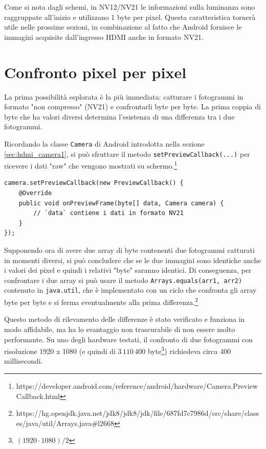 \begin{figure}[H]
\end{figure}

Come si nota dagli schemi, in NV12/NV21 le informazioni sulla luminanza sono raggruppate all'inizio e utilizzano 1 byte per pixel. Questa caratteristica tornerà utile nelle prossime sezioni, in combinazione al fatto che Android fornisce le immagini acquisite dall'ingresso HDMI anche in formato NV21.

\section{Confronto pixel per pixel}
\label{sec:diff_full}

La prima possibilità esplorata è la più immediata: catturare i fotogrammi in formato "non compresso" (NV21) e confrontarli byte per byte. La prima coppia di byte che ha valori diversi determina l'esistenza di una differenza tra i due fotogrammi.

Ricordando la classe \texttt{Camera} di Android introdotta nella sezione \ref{sec:hdmi_camera1}, si può sfruttare il metodo \texttt{setPreviewCallback(...)} per ricevere i dati "raw" che vengono mostrati su schermo.\footnote{https://developer.android.com/reference/android/hardware/Camera.PreviewCallback.html}

\begin{verbatim}
camera.setPreviewCallback(new PreviewCallback() {
    @Override
    public void onPreviewFrame(byte[] data, Camera camera) {
        // `data` contiene i dati in formato NV21
    }
});
\end{verbatim}

Supponendo ora di avere due array di byte contenenti due fotogrammi catturati in momenti diversi, si può concludere che se le due immagini sono identiche anche i valori dei pixel e quindi i relativi "byte" saranno identici. Di conseguenza, per confrontare i due array si può usare il metodo \texttt{Arrays.equals(arr1, arr2)} contenuto in \texttt{java.util}, che è implementato con un ciclo che confronta gli array byte per byte e si ferma eventualmente alla prima differenza.\footnote{https://hg.openjdk.java.net/jdk8/jdk8/jdk/file/687fd7c7986d/src/share/classes/java/util/Arrays.java\#l2668}

Questo metodo di rilevamento delle differenze è stato verificato e funziona in modo affidabile, ma ha lo svantaggio non trascurabile di non essere molto performante. Su uno degli hardware testati, il confronto di due fotogrammi con risoluzione 1920 x 1080 (e quindi di $3\,110\,400$ byte\footnote{$(1920 \cdot 1080) / 2$}) richiedeva circa 400 millisecondi.

